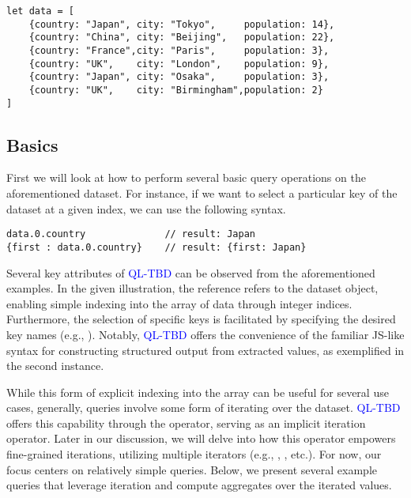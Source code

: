 \documentclass[runningheads]{llncs}
\newcommand{\lang}{\textcolor{blue}{QL-TBD}}
\begin{document}
\begin{lstlisting}[style=JavaScript]
let data = [
    {country: "Japan", city: "Tokyo",     population: 14},
    {country: "China", city: "Beijing",   population: 22},
    {country: "France",city: "Paris",     population: 3},
    {country: "UK",    city: "London",    population: 9},
    {country: "Japan", city: "Osaka",     population: 3},
    {country: "UK",    city: "Birmingham",population: 2}
]
\end{lstlisting}


\subsection{Basics}
First we will look at how to perform several basic query operations on the
aforementioned dataset.
For instance, if we want to select a particular key of the dataset at a given
index, we can use the following syntax.

\begin{lstlisting}[style=JavaScript]
data.0.country              // result: Japan
{first : data.0.country}    // result: {first: Japan}
\end{lstlisting}

Several key attributes of \lang{} can be observed from the aforementioned examples.
In the given illustration, the reference  refers to
the dataset object, enabling simple indexing into the array of data through integer
indices.
Furthermore, the selection of specific keys is facilitated by specifying the desired
key names (e.g., ).
Notably, \lang{} offers the convenience of the familiar JS-like syntax for constructing
structured output from extracted values, as exemplified in the second instance.

While this form of explicit indexing into the array can be useful for several
use cases, generally, queries involve some form of iterating over the dataset.
\lang{} offers this capability through the \inline{*} operator,
serving as an implicit iteration operator.
Later in our discussion, we will delve into how this operator empowers fine-grained
iterations, utilizing multiple iterators
(e.g., , , etc.).
For now, our focus centers on relatively simple queries.
Below, we present several example queries that leverage iteration and compute
aggregates over the iterated values.
\end{document}

